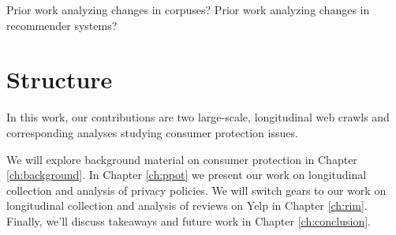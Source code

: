 Prior work analyzing changes in corpuses? Prior work analyzing changes in recommender systems?



\section{Structure}

In this work, our contributions are two large-scale, longitudinal web crawls and corresponding analyses studying consumer protection issues. 

We will explore background material on consumer protection in Chapter \ref{ch:background}. In Chapter \ref{ch:ppot} we present our work on longitudinal collection and analysis of privacy policies.  We will switch gears to our work on longitudinal collection and analysis of reviews on Yelp in Chapter \ref{ch:rim}.  Finally, we'll discuss takeaways and future work in Chapter \ref{ch:conclusion}. 